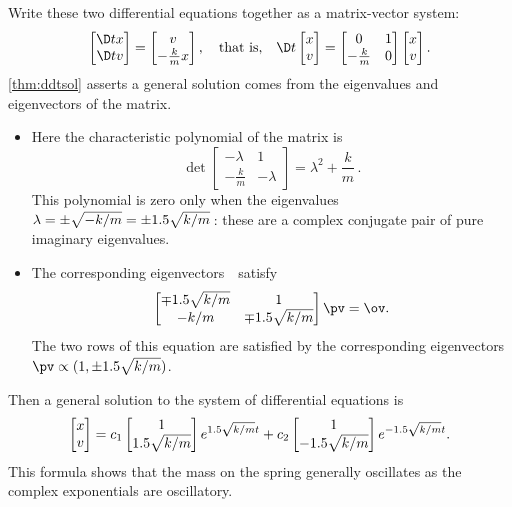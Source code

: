 \begin{reduce}
\begin{example}
\begin{solution}
Write these two differential equations together as a matrix-vector system: 
\begin{equation*}
\begin{bmatrix} \D tx\\\D tv \end{bmatrix}
=\begin{bmatrix} v\\-\frac kmx \end{bmatrix},
\quad\text{that is,}\quad
\D t{}\begin{bmatrix} x\\v \end{bmatrix}
=\begin{bmatrix} 0&1\\-\frac km&0 \end{bmatrix}\begin{bmatrix} x\\v \end{bmatrix}.
\end{equation*}
\autoref{thm:ddtsol} asserts a general solution comes from the eigenvalues and eigenvectors of the matrix.
\begin{itemize}
\item Here the characteristic polynomial of the matrix is
\begin{equation*}
\det\begin{bmatrix} -\lambda&1\\-\frac km&-\lambda \end{bmatrix}
=\lambda^2+\frac km\,.
\end{equation*}
This polynomial is zero only when the eigenvalues \(\lambda=\pm\sqrt{-k/m}=\pm 1.5\sqrt{k/m}\)\,: these are a complex conjugate pair of pure imaginary eigenvalues.

\item  The corresponding eigenvectors~\pv\ satisfy
\begin{equation*}
\begin{bmatrix} \mp \i\sqrt{k/m}&1\\- k/m&\mp \i\sqrt{k/m} \end{bmatrix}
\pv=\ov.
\end{equation*}
The two rows of this equation are satisfied by the corresponding eigenvectors \(\pv\propto (1,\pm \i\sqrt{k/m})\).
\end{itemize}
Then a general solution to the system of differential equations is
\begin{equation*}
\begin{bmatrix} x\\v \end{bmatrix}
=c_1\begin{bmatrix} 1\\1.5\sqrt{k/m} \end{bmatrix}e^{1.5\sqrt{k/m}t}
+c_2\begin{bmatrix} 1\\-1.5\sqrt{k/m} \end{bmatrix}e^{-1.5\sqrt{k/m}t}.
\end{equation*}
This formula shows that the mass on the spring generally oscillates as the complex exponentials are oscillatory.


\end{solution}
\end{example}
\end{reduce}
